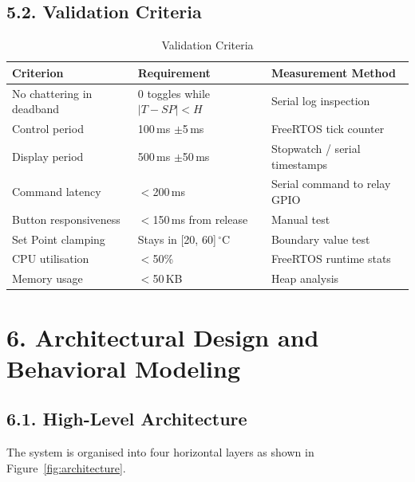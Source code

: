 \documentclass[12pt]{article}
\begin{document}
\subsection*{5.2. Validation Criteria}

\begin{table}[H]
    \centering
    \caption{Validation Criteria}
    \label{tab:validation-criteria}
    \begin{tabular}{|l|l|l|}
        \hline
        \textbf{Criterion} & \textbf{Requirement} & \textbf{Measurement Method} \\
        \hline
        No chattering in deadband & 0 toggles while $|T - SP| < H$ & Serial log inspection \\
        \hline
        Control period & 100\,ms $\pm$5\,ms & FreeRTOS tick counter \\
        \hline
        Display period & 500\,ms $\pm$50\,ms & Stopwatch / serial timestamps \\
        \hline
        Command latency & $<$200\,ms & Serial command to relay GPIO \\
        \hline
        Button responsiveness & $<$150\,ms from release & Manual test \\
        \hline
        Set Point clamping & Stays in [20, 60]\,$^{\circ}$C & Boundary value test \\
        \hline
        CPU utilisation & $<$50\% & FreeRTOS runtime stats \\
        \hline
        Memory usage & $<$50\,KB & Heap analysis \\
        \hline
    \end{tabular}
\end{table}

\section*{6. Architectural Design and Behavioral Modeling}

\subsection*{6.1. High-Level Architecture}

The system is organised into four horizontal layers as shown in
Figure~\ref{fig:architecture}.
\end{document}
